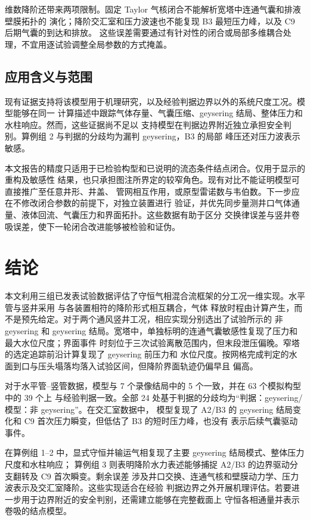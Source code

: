 维数降阶还带来两项限制。固定 Taylor 气核闭合不能解析宽塔中连通气囊和排液壁膜拓扑的
演化；降阶交汇室和压力波速也不能复现 B3 最短压力峰，以及 C9 后期气囊的到达和排放。
这些误差需要通过有针对性的闭合或局部多维耦合处理，不宜用逐试验调整全局参数的方式掩盖。

\subsection{应用含义与范围}

现有证据支持将该模型用于机理研究，以及经验判据边界以外的系统尺度工况。模型能够在同一
计算描述中跟踪气体存量、气囊压缩、geysering 结局、整体压力和水柱响应。然而，这些证据尚不足以
支持模型在判据边界附近独立承担安全判别。算例组 2 与判据的分歧均为漏判 geysering，B3 的局部
峰压还对压力波表示敏感。

本文报告的精度只适用于已检验构型和已说明的流态条件结点闭合。仅用于显示的重构及敏感性
结果，也只承担图注所界定的较窄角色。现有对比不能证明模型可直接推广至任意井形、井盖、
管网相互作用，或原型雷诺数与韦伯数。下一步应在不修改闭合参数的前提下，对独立装置进行
验证，并优先同步量测井口气体通量、液体回流、气囊压力和界面拓扑。这些数据有助于区分
交换律误差与竖井卷吸误差，使下一轮闭合改进能够被检验和证伪。

\section{结论}
\label{sec:conclusions}

本文利用三组已发表试验数据评估了守恒气相混合流框架的分工况一维实现。水平管与竖井采用
与各装置相符的降阶形式相互耦合，气体
释放时程由计算产生，而不是预先给定。对于两个通风竖井工况，相应实现分别选出了试验所示的
非 geysering 和 geysering 结局。宽塔中，单独标明的连通气囊敏感性复现了压力和最大水位尺度；界面事件
时刻位于三次试验离散范围内，但末段泄压偏晚。窄塔的选定追踪前沿计算复现了 geysering 前压力和
水位尺度。按网格完成判定的水面到口与压头塌落均落入试验区间，但降阶界面轨迹仍偏早且
偏高。

对于水平管--竖管数据，模型与 7 个录像结局中的 5 个一致，并在 63 个模拟构型中的 39 个上
与经验判据一致。全部 24 处基于判据的分歧均为“判据：geysering/模型：非 geysering”。在交汇室数据中，
模型复现了 A2/B3 的 geysering 结局变化和 C9 首次压力瞬变，但低估了 B3 的短时压力峰，也没有
表示后续气囊驱动事件。

在算例组 1--2 中，显式守恒并输运气相复现了主要 geysering 结局模式、整体压力尺度和水柱响应；
算例组 3 则表明降阶水力表述能够捕捉 A2/B3 的边界驱动分支翻转及 C9 首次瞬变。剩余误差
涉及井口交换、连通气核和壁膜动力学、压力波表示及交汇室降阶。这些实现适合在经验
判据边界之外开展机理评估。若要进一步用于边界附近的安全判别，还需建立能够在完整截面上
守恒各相通量并表示卷吸的结点模型。
